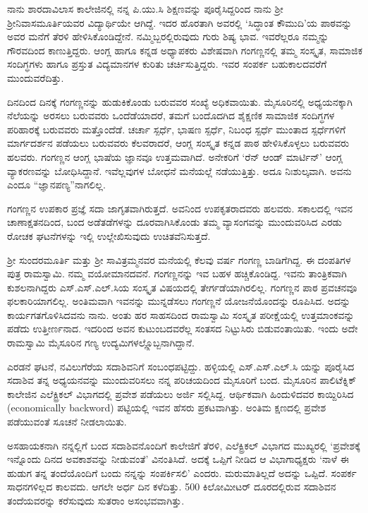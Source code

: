 {ನಾನು ಶಾರದಾವಿಲಾಸ ಕಾಲೇಜಿನಲ್ಲಿ ನನ್ನ ಪಿ.ಯು.ಸಿ ಶಿಕ್ಷಣವನ್ನು ಪೂರೈಸಿದ್ದರಿಂದ ನಾನು ಶ್ರೀ ಶ್ರೀನಿವಾಸಮೂರ್ತಿಯವರ ವಿದ್ಯಾರ್ಥಿಯೇ ಆಗಿದ್ದೆ. ಇದರ ಹೊರತಾಗಿ ಅವರಲ್ಲಿ ‘ಸಿದ್ಧಾಂತ ಕೌಮುದಿ’ಯ ಪಾಠವನ್ನು ಅವರ ಮನೆಗೆ ತೆರಳಿ ಹೇಳಿಸಿಕೊಂಡಿದ್ದೇನೆ. ನಮ್ಮಿಬ್ಬರಲ್ಲಿರುವುದು ಗುರು  \enginline{-}  ಶಿಷ್ಯ ಭಾವ. ಇವರೆಲ್ಲರೂ ನಮ್ಮನ್ನು ಗೌರವದಿಂದ ಕಾಣುತ್ತಿದ್ದರು. ಆಂಗ್ಲ ಹಾಗೂ ಕನ್ನಡ ಅಧ್ಯಾಪಕರು ವಿಶೇಷವಾಗಿ ಗಂಗಣ್ಣನಲ್ಲಿ ತಮ್ಮ ಸಂಸ್ಕೃತ, ಸಾಮಾಜಿಕ ಸಂದಿಗ್ಧಗಳು ಹಾಗೂ ಪ್ರಸ್ತುತ ವಿದ್ಯಮಾನಗಳ ಕುರಿತು ಚರ್ಚಿಸುತ್ತಿದ್ದರು. ಇವರ ಸಂಪರ್ಕ ಬಹುಕಾಲದವರೆಗೆ ಮುಂದುವರೆದಿತ್ತು.

ದಿನದಿಂದ ದಿನಕ್ಕೆ ಗಂಗಣ್ಣನನ್ನು ಹುಡುಕಿಕೊಂಡು ಬರುವವರ ಸಂಖ್ಯೆ ಅಧಿಕವಾಯಿತು. ಮೈಸೂರಿನಲ್ಲಿ ಅಧ್ಯಯನಕ್ಕಾಗಿ ನೆಲೆಯನ್ನು ಅರಸಲು ಬರುವವರು ಒಂದೆಡೆಯಾದರೆ, ತಮಗೆ ಬಂದೊದಗಿದ ಶೈಕ್ಷಣಿಕ  \enginline{-}  ಸಾಮಾಜಿಕ ಸಂದಿಗ್ಧಗಳ ಪರಿಹಾರಕ್ಕೆ ಬರುವವರು ಮತ್ತೊಂದೆಡೆ. ಚರ್ಚಾ ಸ್ಪರ್ಧೆ, ಭಾಷಣ ಸ್ಪರ್ಧೆ, ನಿಬಂಧ ಸ್ಪರ್ಧೆ ಮುಂತಾದ ಸ್ಪರ್ಧೆಗಳಿಗೆ ಮಾರ್ಗದರ್ಶನ ಪಡೆಯಲು ಬರುವವರು ಕೆಲವರಾದರೆ, ಆಂಗ್ಲ  \enginline{-}  ಸಂಸ್ಕೃತ  \enginline{-}  ಕನ್ನಡ ಪಾಠ ಹೇಳಿಸಿಕೊಳ್ಳಲು ಬರುವವರು ಹಲವರು. ಗಂಗಣ್ಣನ ಆಂಗ್ಲ ಭಾಷೆಯ ಜ್ಞಾನವೂ ಉತ್ತಮವಾಗಿದೆ. ಅನೇಕರಿಗೆ ‘ರೆನ್ ಆಂಡ್ ಮಾರ್ಟಿನ್’ ಆಂಗ್ಲ ವ್ಯಾಕರಣವನ್ನು ಬೋಧಿಸಿದ್ದಾನೆ. ಇವೆಲ್ಲವುಗಳ ಬೋಧನೆ ಮನೆಯಲ್ಲೆ ನಡೆಯುತ್ತಿತ್ತು. ಅದೂ ನಿಃಶುಲ್ಕವಾಗಿ. ಅವನು ಎಂದೂ “ಜ್ಞಾನಪಣ್ಯ”ನಾಗಲಿಲ್ಲ.

ಗಂಗಣ್ಣನ ಉಪಕಾರ ಪ್ರಜ್ಞೆ ಸದಾ ಜಾಗೃತವಾಗಿರುತ್ತದೆ. ಅವನಿಂದ ಉಪಕೃತರಾದವರು ಹಲವರು. ಸಕಾಲದಲ್ಲಿ ಇವನ ಚಾಣಾಕ್ಷತನದಿಂದ, ಬಂದ ಅಡೆತಡೆಗಳನ್ನು ದೂರವಾಗಿಸಿಕೊಂಡು ತಮ್ಮ ವ್ಯಾಸಂಗವನ್ನು ಮುಂದುವರಿಸಿದ ಎರಡು ರೋಚಕ ಘಟನೆಗಳನ್ನು ಇಲ್ಲಿ ಉಲ್ಲೇಖಿಸುವುದು ಉಚಿತವೆನಿಸುತ್ತದೆ.

ಶ್ರೀ ಸುಂದರಮೂರ್ತಿ ಮತ್ತು ಶ್ರೀ ಸಾವಿತ್ರಮ್ಮನವರ ಮನೆಯಲ್ಲಿ ಕೆಲವು ವರ್ಷ ಗಂಗಣ್ಣ ಬಾಡಿಗೆಗಿದ್ದ. ಈ ದಂಪತಿಗಳ ಪುತ್ರ ರಾಮಸ್ವಾಮಿ. ನಮ್ಮ ವಯೋಮಾನದವನೆ. ಗಂಗಣ್ಣನನ್ನು ಇವ ಬಹಳ ಹಚ್ಚಿಕೊಂಡಿದ್ದ. ಇವನು ತಾಂತ್ರಿಕವಾಗಿ ಕುಶಲನಾಗಿದ್ದರು ಎಸ್.ಎಸ್.ಎಲ್.ಸಿಯ ಸಂಸ್ಕೃತ ವಿಷಯದಲ್ಲಿ ತೇರ್ಗಡೆಯಾಗಿರಲಿಲ್ಲ. ಗಂಗಣ್ಣನ ಪಾಠ  \enginline{-}  ಪ್ರವಚನವೂ ಫಲಕಾರಿಯಾಗಲಿಲ್ಲ. ಅಂತಿಮವಾಗಿ ಇವನನ್ನು ಮುನ್ನಡೆಸಲು ಗಂಗಣ್ಣನೆ ಯೋಜನೆಯೊಂದನ್ನು ರೂಪಿಸಿದ. ಅದನ್ನು ಕಾರ್ಯಗತಗೊಳಿಸಿದವನು ನಾನು. ಅಂತು ಹರ  \enginline{-}  ಸಾಹಸದಿಂದ ರಾಮಸ್ವಾಮಿ ಸಂಸ್ಕೃತ ಪರೀಕ್ಷೆಯಲ್ಲಿ ಉತ್ತಮಾಂಕವನ್ನು ಪಡೆದು ಉತ್ತೀರ್ಣನಾದ. ಇದರಿಂದ ಅವನ ಕುಟುಂಬದವರೆಲ್ಲ ಸಂತಸದ ನಿಟ್ಟುಸಿರು ಬಿಡುವಂತಾಯಿತು. ಇಂದು ಅದೇ ರಾಮಸ್ವಾಮಿ ಮೈಸೂರಿನ ಗಣ್ಯ ಉದ್ಯಮಿಗಳಲ್ಲ್ಲೊಬ್ಬನಾಗಿದ್ದಾನೆ.

ಎರಡನೆ ಘಟನೆ, ನವಿಲುಗೆರೆಯ ಸದಾಶಿವನಿಗೆ ಸಂಬಂಧಪಟ್ಟಿದ್ದು. ಹಳ್ಳಿಯಲ್ಲಿ ಎಸ್.ಎಸ್.ಎಲ್.ಸಿ ಯನ್ನು ಪೂರೈಸಿದ ಸದಾಶಿವ ತನ್ನ ಅಧ್ಯಯನವನ್ನು ಮುಂದುವರಿಸಲು ನನ್ನ ಪರಿಚಯದಿಂದ ಮೈಸೂರಿಗೆ ಬಂದ. ಮೈಸೂರಿನ ಪಾಲಿಟೆಕ್ನಿಕ್ ಕಾಲೇಜಿನ ಎಲೆಕ್ಟ್ರಿಕಲ್ ವಿಭಾಗದಲ್ಲಿ ಪ್ರವೇಶ ಪಡೆಯಲು ಅರ್ಜಿ ಸಲ್ಲಿಸಿದ್ದ. ಆರ್ಥಿಕವಾಗಿ ಹಿಂದುಳಿದವರ ಕಾಯ್ದಿರಿಸಿದ (economically backword) ಪಟ್ಟಿಯಲ್ಲಿ ಇವನ ಹೆಸರು ಪ್ರಕಟವಾಗಿತ್ತು. ಅಂತಿಮ ಕ್ಷಣದಲ್ಲಿ ಪ್ರವೇಶ ಪಡೆಯುವಂತೆ ಸೂಚನೆ ನೀಡಲಾಯಿತು.

ಅಸಹಾಯಕನಾಗಿ ನನ್ನಲ್ಲಿಗೆ ಬಂದ ಸದಾಶಿವನೊಂದಿಗೆ ಕಾಲೇಜಿಗೆ ತೆರಳಿ, ಎಲೆಕ್ಟ್ರಿಕಲ್ ವಿಭಾಗದ ಮುಖ್ಯರಲ್ಲಿ ‘ಪ್ರವೇಶಕ್ಕೆ ಇನ್ನೊಂದು ದಿನದ ಅವಕಾಶವನ್ನು ನೀಡುವಂತೆ’ ವಿನಂತಿಸಿದೆ. ಅದಕ್ಕೆ ಒಪ್ಪಿಗೆ ನೀಡಿದ ಆ ವಿಭಾಗಾಧ್ಯಕ್ಷರು ‘ನಾಳೆ ಈ ಹುಡುಗ ತನ್ನ ತಂದೆಯೊಂದಿಗೆ ಬಂದು ನನ್ನನ್ನು ಸಂಪರ್ಕಿಸಲಿ’   \enginline{-}   ಎಂದರು. ಮರುಮಾತಿಲ್ಲದೆ ಅದನ್ನು ಒಪ್ಪಿದೆ. ಸಂಪರ್ಕ ಸಾಧನಗಳಿಲ್ಲದ ಕಾಲವದು. ಆಗಲೇ ಅರ್ಧ ದಿನ ಕಳೆದಿತ್ತು. 500 ಕಿಲೋಮೀಟರ್ ದೂರದಲ್ಲಿರುವ ಸದಾಶಿವನ ತಂದೆಯವರನ್ನು ಕರೆಸುವುದು ಸುತರಾಂ ಅಸಂಭವವಾಗಿತ್ತು. 

}
